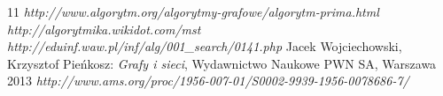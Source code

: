 


%
%


\setcounter{secnumdepth}{-1}
\begin {thebibliography}{11}
 \emph{http://www.algorytm.org/algorytmy-grafowe/algorytm-prima.html}
\emph{http://algorytmika.wikidot.com/mst}
\emph{http://eduinf.waw.pl/inf/alg/001\_search/0141.php}
Jacek Wojciechowski, Krzysztof Pieńkosz: \emph{Grafy i sieci},  Wydawnictwo Naukowe PWN SA, Warszawa 2013
 \emph{http://www.ams.org/proc/1956-007-01/S0002-9939-1956-0078686-7/}
\end {thebibliography}
\listoffigures
{}
